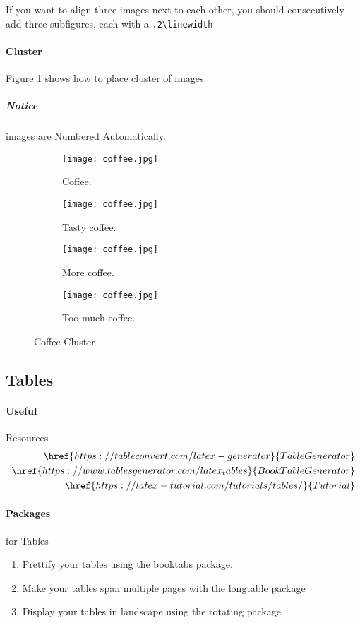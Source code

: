 \documentclass{report}[a4paper,12pt] %
\begin{document}
If you want to align three images next to each other,
you should consecutively add three subfigures, each with a \verb|.2\linewidth|


\paragraph{Cluster}
Figure \ref{fig:coffee3} shows how to place cluster of images.

\subparagraph{Notice} images are Numbered Automatically.

\begin{figure}[h!]
  \centering
  \begin{subfigure}[b]{0.2\linewidth}
    \texttt{[image: coffee.jpg]}
     \caption{Coffee.}
  \end{subfigure}
  \begin{subfigure}[b]{0.2\linewidth}
    \texttt{[image: coffee.jpg]}
    \caption{Tasty coffee.}
  \end{subfigure}
  \begin{subfigure}[b]{0.2\linewidth}
    \texttt{[image: coffee.jpg]}
    \caption{More coffee.}
  \end{subfigure}
  \begin{subfigure}[b]{0.5\linewidth}
    \texttt{[image: coffee.jpg]}
    \caption{Too much coffee.}
  \end{subfigure}
  \caption{Coffee Cluster}
  \label{fig:coffee3}
\end{figure}

\subsection{Tables}

\paragraph{Useful} Resources
\begin{align*}
  \href{https://tableconvert.com/latex-generator}{Table Generator}\\
  \href{https://www.tablesgenerator.com/latex_tables}{Book Table Generator}\\
  \href{https://latex-tutorial.com/tutorials/tables/}{Tutorial}
\end{align*}

\paragraph*{Packages} for Tables
\begin{enumerate}
  \item Prettify your tables using the booktabs package.
  \item Make your tables span multiple pages with the longtable package
  \item Display your tables in landscape using the rotating package  
\end{enumerate}
\end{document}
